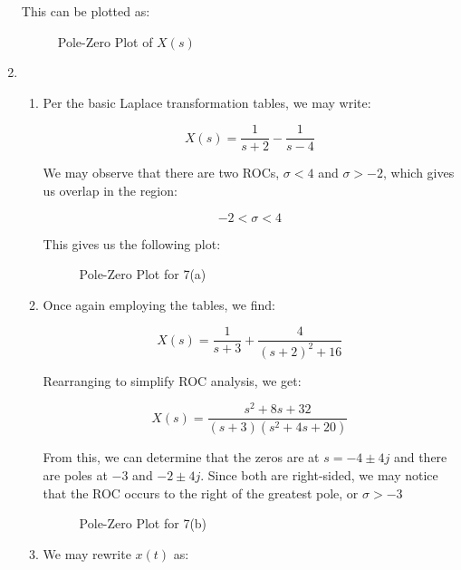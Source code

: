 \begin{enumerate}
          This can be plotted as:

          \begin{figure}[H]
            \centering
            
            \caption{Pole-Zero Plot of $X(s)$}
            \label{fig:1}
          \end{figure}

  \item

    \begin{enumerate}

      \item 

        Per the basic Laplace transformation tables, we may write:

        $$\boxed{X(s)=\frac{1}{s+2}-\frac{1}{s-4}}$$

        We may observe that there are two ROCs, $\sigma<4$ and $\sigma>-2$, which gives us overlap in the region:

        $$\boxed{-2<\sigma<4}$$

        This gives us the following plot:

        \begin{figure}[H]
          \centering
          
          \caption{Pole-Zero Plot for 7(a)}
          \label{fig:2}
        \end{figure}

      \item 

        Once again employing the tables, we find:

        $$X(s)=\frac{1}{s+3}+\frac{4}{(s+2)^2+16}$$

        Rearranging to simplify ROC analysis, we get:

        $$\boxed{X(s)=\frac{s^2+8s+32}{(s+3)(s^2+4s+20)}}$$

        From this, we can determine that the zeros are at $s=-4\pm4j$ and there are poles at $-3$ and $-2\pm4j$. Since both are right-sided, we may notice that the ROC occurs to the right of the greatest pole, or $\sigma>-3$

        \begin{figure}[H]
          \centering
          
          \caption{Pole-Zero Plot for 7(b)}
          \label{fig:3}
        \end{figure}

      \item 

        We may rewrite $x(t)$ as:


\end{enumerate}
\end{enumerate}
